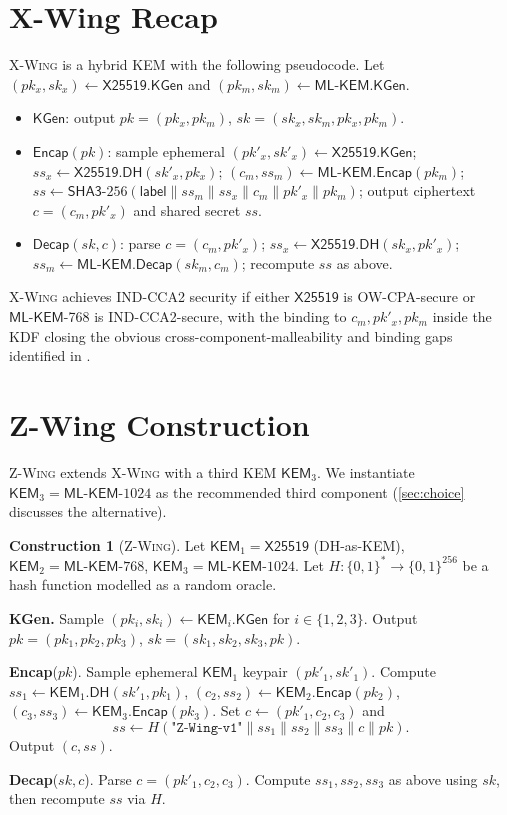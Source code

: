 \documentclass[11pt,a4paper]{article}
\theoremstyle{definition}
\newtheorem{construction}[theorem]{Construction}
\theoremstyle{remark}
\newcommand{\KEM}{\ensuremath{\mathsf{KEM}}}
\newcommand{\KGen}{\ensuremath{\mathsf{KGen}}}
\newcommand{\Encap}{\ensuremath{\mathsf{Encap}}}
\newcommand{\Decap}{\ensuremath{\mathsf{Decap}}}
\providecommand{\BB}{}\renewcommand{\BB}{\ensuremath{\{0,1\}}}
\newcommand{\xwing}{\textsc{X-Wing}}
\newcommand{\zwing}{\textsc{Z-Wing}}
\newcommand{\mlkem}{\ensuremath{\mathsf{ML\text{-}KEM}}}
\newcommand{\xtf}{\ensuremath{\mathsf{X25519}}}
\newcommand{\sha}{\ensuremath{\mathsf{SHA3}}}
\begin{document}
\section{X-Wing Recap}\label{sec:xwing-recap}

\xwing{} \cite{xwing2024} is a hybrid KEM with the following pseudocode.
Let $(pk_x, sk_x) \gets \xtf.\KGen$ and $(pk_m, sk_m) \gets \mlkem.\KGen$.

\begin{itemize}
\item $\KGen$: output $pk = (pk_x, pk_m)$, $sk = (sk_x, sk_m, pk_x, pk_m)$.
\item $\Encap(pk)$: sample ephemeral $(pk'_x, sk'_x) \gets \xtf.\KGen$;
$ss_x \gets \xtf.\mathsf{DH}(sk'_x, pk_x)$;
$(c_m, ss_m) \gets \mlkem.\Encap(pk_m)$;
$ss \gets \sha\text{-}256(\mathsf{label} \parallel ss_m \parallel ss_x \parallel c_m \parallel pk'_x \parallel pk_m)$;
output ciphertext $c = (c_m, pk'_x)$ and shared secret $ss$.
\item $\Decap(sk, c)$: parse $c = (c_m, pk'_x)$;
$ss_x \gets \xtf.\mathsf{DH}(sk_x, pk'_x)$;
$ss_m \gets \mlkem.\Decap(sk_m, c_m)$;
recompute $ss$ as above.
\end{itemize}

\xwing{} achieves IND-CCA2 security if either \xtf{} is OW-CPA-secure or
\mlkem{}-768 is IND-CCA2-secure, with the binding to $c_m, pk'_x, pk_m$ inside
the KDF closing the obvious cross-component-malleability and binding gaps
identified in \cite{giacon2018kem}.

\section{Z-Wing Construction}\label{sec:zwing}

\zwing{} extends \xwing{} with a third KEM $\KEM_3$. We instantiate
$\KEM_3 = \mlkem\text{-}1024$ as the recommended third component
(\cref{sec:choice} discusses the alternative).

\begin{construction}[\zwing{}]\label{con:zwing}
Let $\KEM_1 = \xtf$ (DH-as-KEM), $\KEM_2 = \mlkem\text{-}768$,
$\KEM_3 = \mlkem\text{-}1024$. Let $H : \BB^* \to \BB^{256}$ be a hash
function modelled as a random oracle.

\textbf{KGen.} Sample $(pk_i, sk_i) \gets \KEM_i.\KGen$ for $i \in \{1,2,3\}$.
Output $pk = (pk_1, pk_2, pk_3)$, $sk = (sk_1, sk_2, sk_3, pk)$.

\textbf{Encap}($pk$). Sample ephemeral $\KEM_1$ keypair $(pk'_1, sk'_1)$.
Compute $ss_1 \gets \KEM_1.\mathsf{DH}(sk'_1, pk_1)$,
$(c_2, ss_2) \gets \KEM_2.\Encap(pk_2)$,
$(c_3, ss_3) \gets \KEM_3.\Encap(pk_3)$.
Set $c \gets (pk'_1, c_2, c_3)$ and
\[
ss \gets H\!\left(\texttt{"Z-Wing-v1"} \parallel ss_1 \parallel ss_2 \parallel ss_3 \parallel c \parallel pk\right).
\]
Output $(c, ss)$.

\textbf{Decap}($sk, c$). Parse $c = (pk'_1, c_2, c_3)$.
Compute $ss_1, ss_2, ss_3$ as above using $sk$, then recompute $ss$ via $H$.
\end{construction}
\end{document}
